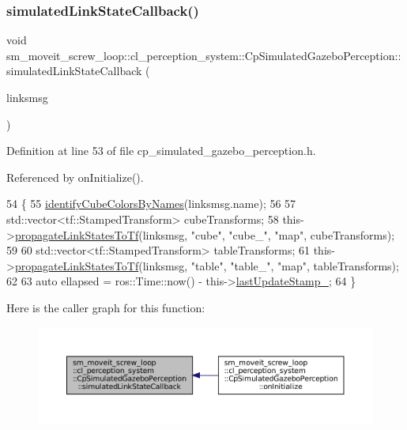 \subsubsection{\texorpdfstring{simulated\+Link\+State\+Callback()}{simulatedLinkStateCallback()}}
{\footnotesize\ttfamily void sm\+\_\+moveit\+\_\+screw\+\_\+loop\+::cl\+\_\+perception\+\_\+system\+::\+Cp\+Simulated\+Gazebo\+Perception\+::simulated\+Link\+State\+Callback (\begin{DoxyParamCaption}\item[{const gazebo\+\_\+msgs\+::\+Link\+States \&}]{linksmsg }\end{DoxyParamCaption})\hspace{0.3cm}{\ttfamily [inline]}}



Definition at line 53 of file cp\+\_\+simulated\+\_\+gazebo\+\_\+perception.\+h.



Referenced by on\+Initialize().


\begin{DoxyCode}
54             \{
55                 \hyperlink{classsm__moveit__screw__loop_1_1cl__perception__system_1_1CpSimulatedGazeboPerception_a3bc3d5a775d74573b93f8b585b89282c}{identifyCubeColorsByNames}(linksmsg.name);
56 
57                 std::vector<tf::StampedTransform> cubeTransforms;
58                 this->\hyperlink{classsm__moveit__screw__loop_1_1cl__perception__system_1_1CpSimulatedGazeboPerception_a407cca108d4a7d0ae6a4eb3c4c843eaf}{propagateLinkStatesToTf}(linksmsg, \textcolor{stringliteral}{"cube"}, \textcolor{stringliteral}{"cube\_"}, \textcolor{stringliteral}{"map"}, 
      cubeTransforms);
59 
60                 std::vector<tf::StampedTransform> tableTransforms;
61                 this->\hyperlink{classsm__moveit__screw__loop_1_1cl__perception__system_1_1CpSimulatedGazeboPerception_a407cca108d4a7d0ae6a4eb3c4c843eaf}{propagateLinkStatesToTf}(linksmsg, \textcolor{stringliteral}{"table"}, \textcolor{stringliteral}{"table\_"}, \textcolor{stringliteral}{"map"}, 
      tableTransforms);
62 
63                 \textcolor{keyword}{auto} ellapsed = ros::Time::now() - this->\hyperlink{classsm__moveit__screw__loop_1_1cl__perception__system_1_1CpSimulatedGazeboPerception_ad4271e87940df852a626369253bc40fc}{lastUpdateStamp\_};
64             \}
\end{DoxyCode}
Here is the caller graph for this function\+:
\nopagebreak
\begin{figure}[H]
\begin{center}
\leavevmode
\includegraphics[width=350pt]{classsm__moveit__screw__loop_1_1cl__perception__system_1_1CpSimulatedGazeboPerception_a430e4834d41a548427c0f9af3f03a2f3_icgraph}
\end{center}
\end{figure}


